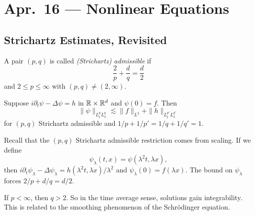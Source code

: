 \chapter{Apr.~16 --- Nonlinear Equations}

\section{Strichartz Estimates, Revisited}
\begin{definition}
  A pair $(p, q)$ is called \emph{(Strichartz) admissible}
  if
  \[\frac{2}{p} + \frac{d}{q} = \frac{d}{2}\]
  and $2 \le p \le \infty$ with
  $(p, q) \ne (2, \infty)$.
\end{definition}

\begin{theorem}\label{thm:strichartz-full}
  Suppose $i \partial_t \psi - \Delta \psi = h$
  in $\mathbb{R} \times \mathbb{R}^d$ and $\psi(0) = f$. Then
  \[
    \|\psi\|_{L^p_t L^q_x}
    \lesssim \|f\|_{L^2} + \|h\|_{L^{p'}_t L^{q'}_x}
  \]
  for $(p, q)$ Strichartz admissible and
  $1 / p + 1 / p' = 1 / q + 1 / q' = 1$.
\end{theorem}

\begin{remark}
  Recall that the $(p, q)$ Strichartz admissible
  restriction comes from scaling. If we define
  \[
    \psi_\lambda(t, x) = \psi(\lambda^2 t, \lambda x),
  \]
  then $i \partial_t \psi_\lambda - \Delta \psi_\lambda = h(\lambda^2 t, \lambda x) / \lambda^2$
  and $\psi_\lambda(0) = f(\lambda x)$. The
  bound on $\psi_\lambda$ forces
  $2 / p + d / q = d / 2$.
\end{remark}

\begin{remark}
  If $p < \infty$, then $q > 2$. So in the
  time average sense, solutions
  gain integrability. This is related to the
  smoothing phenomenon of the Schr\"odinger
  equation.
\end{remark}

